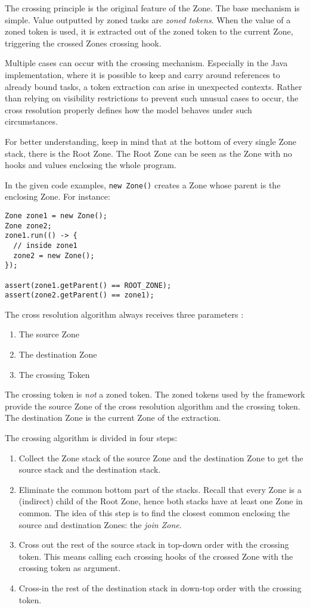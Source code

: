 The crossing principle is the original feature of the Zone. The base mechanism is simple. Value outputted by zoned tasks are \emph{zoned tokens}. When the value of a zoned token is used, it is extracted out of the zoned token to the current Zone, triggering the crossed Zones crossing hook.

Multiple cases can occur with the crossing mechanism. Especially in the Java implementation, where it is possible to keep and carry around references to already bound tasks, a token extraction can arise in unexpected contexts. Rather than relying on visibility restrictions to prevent such unusual cases to occur, the cross resolution properly defines how the model behaves under such circumstances.

For better understanding, keep in mind that at the bottom of every single Zone stack, there is the Root Zone. The Root Zone can be seen as the Zone with no hooks and values enclosing the whole program.

In the given code examples, \lstinline{new Zone()} creates a Zone whose parent is the enclosing Zone. For instance:

\begin{lstlisting}
Zone zone1 = new Zone();
Zone zone2;
zone1.run(() -> {
  // inside zone1
  zone2 = new Zone();
});

assert(zone1.getParent() == ROOT_ZONE);
assert(zone2.getParent() == zone1);
\end{lstlisting}

The cross resolution algorithm always receives three parameters :

\begin{enumerate}
\item The source Zone
\item The destination Zone
\item The crossing Token
\end{enumerate}

The crossing token is \emph{not} a zoned token. The zoned tokens used by the framework provide the source Zone of the cross resolution algorithm and the crossing token. The destination Zone is the current Zone of the extraction.

The crossing algorithm is divided in four steps:
\begin{enumerate}
\item Collect the Zone stack of the source Zone and the destination Zone to get the source stack and the destination stack.
\item Eliminate the common bottom part of the stacks. Recall that every Zone is a (indirect) child of the Root Zone, hence both stacks have at least one Zone in common. The idea of this step is to find the closest common enclosing the source and destination Zones: the \emph{join Zone}.
\item Cross out the rest of the source stack in top-down order with the crossing token. This means calling each crossing hooks of the crossed Zone with the crossing token as argument.
\item Cross-in the rest of the destination stack in down-top order with the crossing token.
\end{enumerate}

